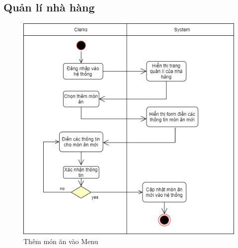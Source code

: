 \newpage
\subsection{Quản lí nhà hàng}
\begin{figure}[!h]
    \begin{center}
        \includegraphics[scale=0.45]{Images/ActivityDiagram/AD_add.png}
    \end{center}
    \hspace{0.3cm}
    \caption{Thêm món ăn vào Menu}
\end{figure}
